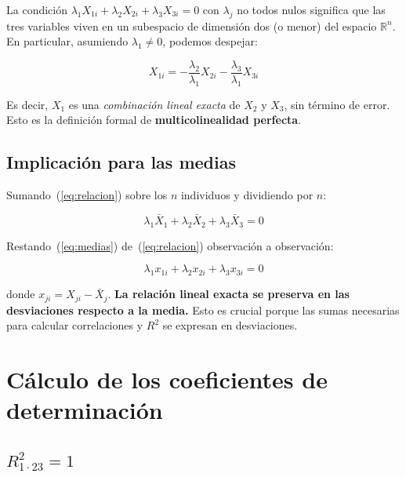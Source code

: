 \documentclass[12pt, letterpaper]{article}
\theoremstyle{remark}
\newcommand{\Rd}[2]{R^2_{#1 \cdot #2}} %
\begin{document}
La condición $\lambda_1 X_{1i} + \lambda_2 X_{2i} + \lambda_3 X_{3i} = 0$ con
$\lambda_j$ no todos nulos significa que las tres variables viven en un subespacio
de dimensión dos (o menor) del espacio $\mathbb{R}^n$. En particular, asumiendo
$\lambda_1 \neq 0$, podemos despejar:

\begin{equation}
  X_{1i} = -\frac{\lambda_2}{\lambda_1} X_{2i}
            -\frac{\lambda_3}{\lambda_1} X_{3i}
  \label{eq:despeje_X1}
\end{equation}

\noindent Es decir, $X_1$ es una \emph{combinación lineal exacta} de $X_2$ y
$X_3$, sin término de error. Esto es la definición formal de
\textbf{multicolinealidad perfecta}.

\subsection{Implicación para las medias}

Sumando~(\ref{eq:relacion}) sobre los $n$ individuos y dividiendo por $n$:

\begin{equation}
  \lambda_1 \bar{X}_1 + \lambda_2 \bar{X}_2 + \lambda_3 \bar{X}_3 = 0
  \label{eq:medias}
\end{equation}

Restando~(\ref{eq:medias}) de~(\ref{eq:relacion}) observación a observación:

\begin{equation}
  \lambda_1 x_{1i} + \lambda_2 x_{2i} + \lambda_3 x_{3i} = 0
  \label{eq:desviaciones}
\end{equation}

\noindent donde $x_{ji} = X_{ji} - \bar{X}_j$. \textbf{La relación lineal exacta
se preserva en las desviaciones respecto a la media.} Esto es crucial porque las
sumas necesarias para calcular correlaciones y $R^2$ se expresan en desviaciones.

\section{Cálculo de los coeficientes de determinación}

\subsection{\texorpdfstring{$\Rd{1}{23} = 1$}{R2-1.23 = 1}}
\end{document}
